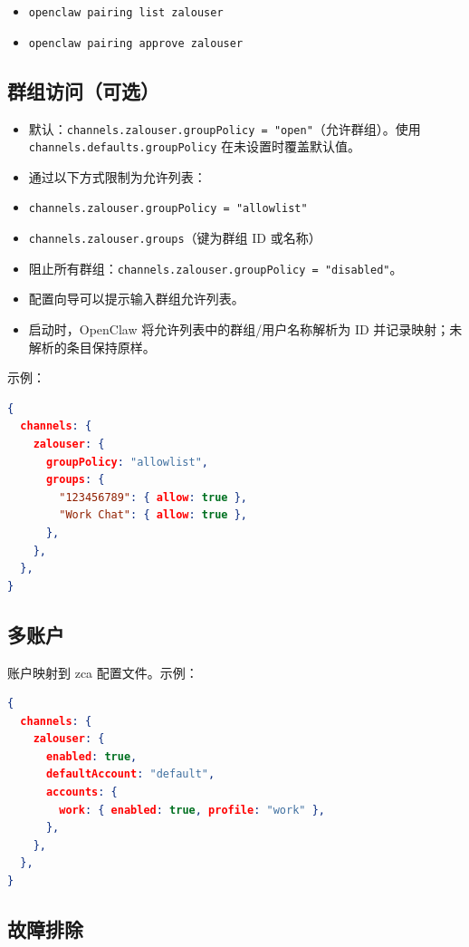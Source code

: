 \begin{itemize}
  \item \texttt{openclaw pairing list zalouser}
  \item \texttt{openclaw pairing approve zalouser }
\end{itemize}


\subsection{群组访问（可选）}


\begin{itemize}
  \item 默认：\texttt{channels.zalouser.groupPolicy = "open"}（允许群组）。使用 \texttt{channels.defaults.groupPolicy} 在未设置时覆盖默认值。
  \item 通过以下方式限制为允许列表：
  \item \texttt{channels.zalouser.groupPolicy = "allowlist"}
  \item \texttt{channels.zalouser.groups}（键为群组 ID 或名称）
  \item 阻止所有群组：\texttt{channels.zalouser.groupPolicy = "disabled"}。
  \item 配置向导可以提示输入群组允许列表。
  \item 启动时，OpenClaw 将允许列表中的群组/用户名称解析为 ID 并记录映射；未解析的条目保持原样。
\end{itemize}


示例：

\begin{lstlisting}[language=json]
{
  channels: {
    zalouser: {
      groupPolicy: "allowlist",
      groups: {
        "123456789": { allow: true },
        "Work Chat": { allow: true },
      },
    },
  },
}
\end{lstlisting}


\subsection{多账户}


账户映射到 zca 配置文件。示例：

\begin{lstlisting}[language=json]
{
  channels: {
    zalouser: {
      enabled: true,
      defaultAccount: "default",
      accounts: {
        work: { enabled: true, profile: "work" },
      },
    },
  },
}
\end{lstlisting}


\subsection{故障排除}


